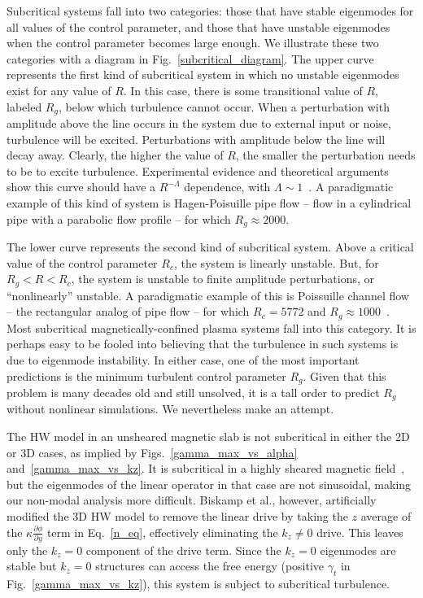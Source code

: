 \documentclass[letter,scriptaddress,twocolumn, prl,showkeys]{revtex4}
\newcommand{\pdiff}[2]{\frac{\partial#1}{\partial#2}}
\begin{document}
Subcritical systems fall into two categories: those that have stable eigenmodes for all values of the control parameter, and those that have unstable eigenmodes
when the control parameter becomes large enough. We illustrate these two categories with a diagram in Fig.~\ref{subcritical_diagram}. 
The upper curve represents the first kind of subcritical system in which no unstable eigenmodes exist for any value of $R$. In this
case, there is some transitional value of $R$, labeled $R_g$, below which turbulence cannot occur. When a perturbation with amplitude above the line occurs in the system due to external input or noise, 
turbulence will be excited. Perturbations with amplitude below the line will decay away. Clearly, the higher the value of $R$, the smaller the perturbation needs to be to excite turbulence.
Experimental evidence and theoretical arguments show this curve should have a $R^{-\Lambda}$ dependence, with $\Lambda \sim 1$~\cite{grossmann2000}.
A paradigmatic example of this kind of system is Hagen-Poisuille pipe flow -- flow in a cylindrical pipe with a parabolic flow profile -- for which $R_g \approx 2000$.

The lower curve represents the second kind of subcritical system. Above a critical value of the control parameter $R_c$, the system is linearly unstable. But, for $R_g < R < R_c$, the system is
unstable to finite amplitude perturbations, or ``nonlinearly'' unstable. A paradigmatic example of this is Poissuille channel flow -- the rectangular analog of pipe flow -- for which
$R_c = 5772$ and $R_g \approx 1000$~\cite{grossmann2000}. Most subcritical magnetically-confined plasma systems fall into this category. It is perhaps easy to be fooled into believing that the turbulence
in such systems is due to eigenmode instability. In either case, one of the most important predictions is the minimum turbulent control parameter $R_g$. Given that this problem is many decades old
and still unsolved, it is a tall order to predict $R_g$ without nonlinear simulations. We nevertheless make an attempt.

The HW model in an unsheared magnetic slab is not subcritical in either the 2D or 3D cases, as implied by Figs.~\ref{gamma_max_vs_alpha} and~\ref{gamma_max_vs_kz}. It is subcritical in a highly sheared
magnetic field~\cite{drake1995}, but the eigenmodes of the linear operator in that case are not sinusoidal, making our non-modal analysis more difficult. 
Biskamp et al., however, artificially modified the
3D HW model to remove the linear drive by taking the $z$ average of the $\kappa \pdiff{\phi}{y}$ term in Eq.~\ref{n_eq}, effectively eliminating the $k_z \ne 0$ drive. This leaves only the $k_z = 0$
component of the drive term. Since the $k_z = 0$ eigenmodes are stable but $k_z = 0$ structures can access the free energy (positive $\gamma_t$ in Fig.~\ref{gamma_max_vs_kz}), this system is subject
to subcritical turbulence.
\end{document}
